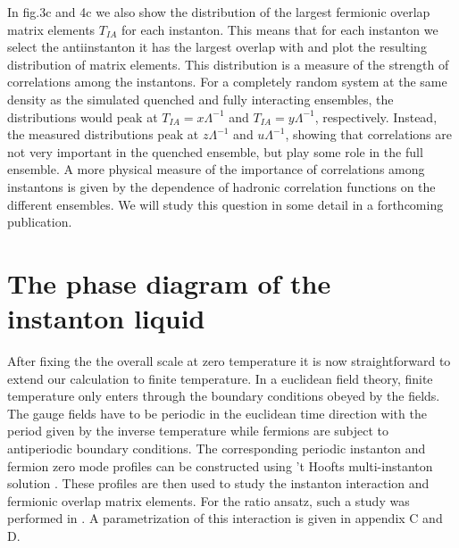    In fig.3c and 4c we also show the distribution of the largest fermionic
overlap matrix elements $T_{IA}$ for each instanton. This means that for
each instanton we select the antiinstanton it has the largest overlap
with and plot the resulting distribution of matrix elements. This
distribution is a measure of the strength of correlations among the
instantons. For a completely random system at the same density as the
simulated quenched and fully interacting ensembles, the distributions
would peak at $T_{IA}=x \Lambda^{-1}$ and $T_{IA}=y\Lambda^{-1}$,
respectively. Instead, the measured distributions peak at $z\Lambda^{-1}$
and $u\Lambda^{-1}$, showing that correlations are not very important
in the quenched ensemble, but play some role in the full ensemble.
A more physical measure of the importance of correlations among instantons
is given by the dependence of hadronic correlation functions on the
different ensembles. We will study this question in some detail in
a forthcoming publication.





\section{The phase diagram of the instanton liquid}

    After fixing the the overall scale at zero temperature it is
now straightforward to extend our calculation to finite temperature.
In a euclidean field theory, finite temperature only enters through the
boundary conditions obeyed by the fields. The gauge fields have to be
periodic in the euclidean time direction with the period given by
the inverse temperature while fermions are subject to antiperiodic
boundary conditions. The corresponding periodic instanton and fermion
zero mode profiles can be constructed using 't Hoofts multi-instanton
solution \cite{HS_78}. These profiles are then used to study the
instanton interaction and fermionic overlap matrix elements. For the
ratio ansatz, such a study was performed in \cite{SV_91}. A
parametrization of this interaction is given in appendix C and D.

